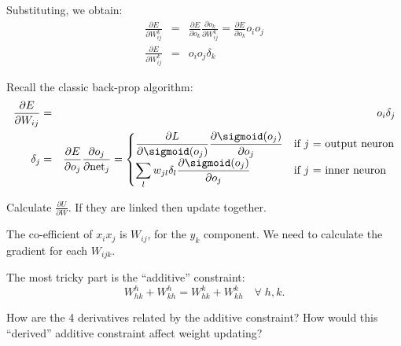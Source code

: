 Substituting, we obtain:
\begin{eqnarray}
\frac{\partial E}{\partial W_{ij}^k}
&=& \frac{\partial E}{\partial o_k} \frac{\partial o_k}{\partial W_{ij}^k}
= \frac{\partial E}{\partial o_k} o_i o_j \nonumber \\ 
\frac{\partial E}{\partial W_{ij}^k}
&=& o_i o_j \delta_k
\end{eqnarray}

Recall the classic back-prop algorithm:
\begin{eqnarray}
\frac{\partial E}{\partial W_{i j}} &=& o_i \delta_j \\
\delta_j &=& \frac{\partial E}{\partial o_j} \frac{\partial o_j}{\partial \mathrm{net}_j} =
	\begin{cases}
	\displaystyle
	\frac{\partial L}{\partial \sigmoid(o_j)} \frac{\partial \sigmoid(o_j)}{\partial o_j} & \text{if $j$ = output neuron} \\
	\displaystyle
	\sum_l w_{j l} \delta_l \frac{\partial \sigmoid(o_j)}{\partial o_j} &  \text{if $j$ = inner neuron} 
	\end{cases}
\end{eqnarray}

Calculate $\frac{\partial U}{\partial W}$.  If they are linked then update together.

The co-efficient of $x_i x_j$ is $W_{i j}$, for the $y_k$ component.  We need to calculate the gradient for each $W_{i j k}$.  

The most tricky part is the ``additive'' constraint:
\begin{equation}
W_{hk}^h + W_{kh}^h = W_{hk}^k + W_{kh}^k \quad \forall \; h,k .
\end{equation}

How are the 4 derivatives related by the additive constraint?  How would this ``derived'' additive constraint affect weight updating?




